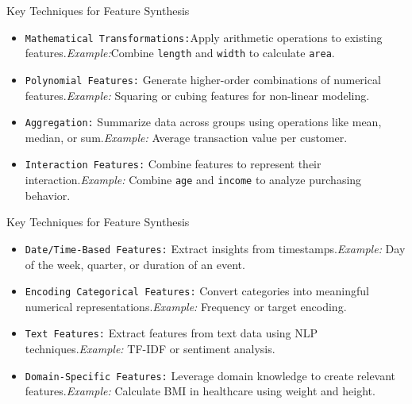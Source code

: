 \documentclass[serif, aspectratio=169]{beamer}
\begin{document}
\begin{frame}{Key Techniques for Feature Synthesis}
    \begin{itemize}
        \item \texttt{\color{teal}Mathematical Transformations:}Apply arithmetic operations to existing features.\hfill \textit{Example:}Combine \texttt{length} and \texttt{width} to calculate \texttt{area}.
    
        \item \texttt{\color{teal}Polynomial Features:} Generate higher-order combinations of numerical features.\hfill \textit{Example:} Squaring or cubing features for non-linear modeling.
    
        \item \texttt{\color{teal}Aggregation:} Summarize data across groups using operations like mean, median, or sum.\hfill \textit{Example:} Average transaction value per customer.
    
        \item \texttt{\color{teal}Interaction Features:} Combine features to represent their interaction.\hfill \textit{Example:} Combine \texttt{age} and \texttt{income} to analyze purchasing behavior.
    \end{itemize}  
\end{frame}

\begin{frame}{Key Techniques for Feature Synthesis}
    \begin{itemize}
        \item \texttt{\color{teal}Date/Time-Based Features:} Extract insights from timestamps.\hfill \textit{Example:} Day of the week, quarter, or duration of an event.
    
        \item \texttt{\color{teal}Encoding Categorical Features:} Convert categories into meaningful numerical representations.\hfill \textit{Example:} Frequency or target encoding.
    
        \item \texttt{\color{teal}Text Features:} Extract features from text data using NLP techniques.\hfill \textit{Example:} TF-IDF or sentiment analysis.
    
        \item \texttt{\color{teal}Domain-Specific Features:} Leverage domain knowledge to create relevant features.\hfill \textit{Example:} Calculate BMI in healthcare using weight and height.
    \end{itemize}  
\end{frame}
\end{document}
